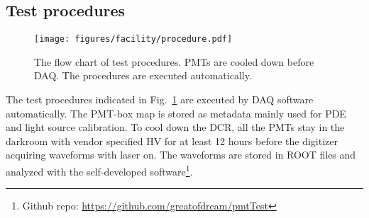 \subsection{Test procedures}
\begin{figure}
    \centering
    \texttt{[image: figures/facility/procedure.pdf]}
    \caption{The flow chart of test procedures. PMTs are cooled down before DAQ. The procedures are executed automatically.}
    \label{fig:testingprocedure}
\end{figure}

The test procedures indicated in Fig.~\ref{fig:testingprocedure} are executed by DAQ software automatically. The PMT-box map is stored as metadata mainly used for PDE and light source calibration. To cool down the DCR, all the PMTs stay in the darkroom with vendor specified HV for at least 12 hours before the digitizer acquiring waveforms with laser on. The waveforms are stored in ROOT files and analyzed with the self-developed software\footnote{Github repo: \url{https://github.com/greatofdream/pmtTest}}.
